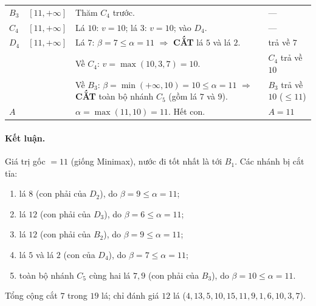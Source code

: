 \documentclass[a4paper,11pt]{article}
\begin{document}
\begin{longtable}{@{}p{1.0cm} >{\raggedright\arraybackslash}p{2.5cm} >{\raggedright\arraybackslash}p{8.3cm} >{\raggedright\arraybackslash}p{3.3cm}@{}}
$B_3$ & $[11,+\infty]$ & Thăm $C_4$ trước. & --- \\
$C_4$ & $[11,+\infty]$ & Lá $10$: $v=10$; lá $3$: $v=10$; vào $D_4$. & --- \\
$D_4$ & $[11,+\infty]$ & Lá $7$: $\beta=7\le\alpha=11$ $\Rightarrow$ \textbf{CẮT} lá $5$ và lá $2$. & trả về $7$ \\
 & & Về $C_4$: $v=\max(10,3,7)=10$. & $C_4$ trả về $10$ \\
 & & Về $B_3$: $\beta=\min(+\infty,10)=10\le\alpha=11$ $\Rightarrow$ \textbf{CẮT} toàn bộ nhánh $C_5$ (gồm lá $7$ và $9$). & $B_3$ trả về $10$ ($\le 11$) \\
$A$ & & $\alpha=\max(11,10)=11$. Hết con. & $A=11$ \\
\bottomrule
\end{longtable}
\normalsize

\paragraph{Kết luận.} Giá trị gốc $=11$ (giống Minimax), nước đi tốt nhất là tới $B_1$. Các nhánh bị cắt tỉa:
\begin{enumerate}[nosep]
  \item lá $8$ (con phải của $D_2$), do $\beta=9\le\alpha=11$;
  \item lá $12$ (con phải của $D_3$), do $\beta=6\le\alpha=11$;
  \item lá $12$ (con phải của $B_2$), do $\beta=9\le\alpha=11$;
  \item lá $5$ và lá $2$ (con của $D_4$), do $\beta=7\le\alpha=11$;
  \item toàn bộ nhánh $C_5$ cùng hai lá $7,9$ (con phải của $B_3$), do $\beta=10\le\alpha=11$.
\end{enumerate}
Tổng cộng cắt $7$ trong $19$ lá; chỉ đánh giá $12$ lá ($4,13,5,10,15,11,9,1,6,10,3,7$).
\end{document}
